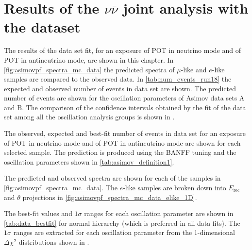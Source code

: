 \clearpage

\section {Results of the $\nu\bar{\nu}$ joint analysis with the \RunPeriod dataset}
\label{sec:results}

The results of the \RunPeriod data set fit, for an exposure of \TotalPotNuRunOneEight POT in neutrino mode and of \TotalPotNuBarRunOneEight POT in antineutrino mode, are shown in this chapter. In \cref{fig:asimovpf_spectra_mc_data} the predicted spectra of $\mu$-like and $e$-like samples are compared to the observed data. In \cref{tab:num_events_run18} the expected and observed number of events in \RunPeriod data set are shown. The predicted number of events are shown for the oscillation parameters of Asimov data sets A and B. The comparison of the confidence intervals obtained by the fit of the \RunPeriod data set among all the oscillation analysis groups is shown in \cite{MaCh3:2017}.

\begin{table}[htb]
\centering
\begin{adjustbox}{width=\textwidth, totalheight=\textheight, keepaspectratio}

\end{adjustbox}
\caption{
The observed, expected and best-fit number of events in \RunPeriod data set for an exposure of \TotalPotNuRunOneEight POT in neutrino mode and of \TotalPotNuBarRunOneEight POT in antineutrino mode are shown 
for each selected sample. The prediction is produced using the BANFF tuning and the oscillation parameters shown in \cref{tab:asimov_definition1}.
}
\label{tab:num_events_run18}
\end{table}

The predicted and observed spectra are shown for each of the samples in \cref{fig:asimovpf_spectra_mc_data}. The $e$-like samples are broken down into $E_\text{rec}$ and $\theta$ projections in \cref{fig:asimovpf_spectra_mc_data_elike_1D}.



The best-fit values and $1\sigma$ ranges for each oscillation parameter are shown in \cref{tab:data_bestfit} for normal hierarchy (which is preferred in all data fits). The $1\sigma$ ranges are extracted for each oscillation parameter from the 1-dimensional $\Delta \chi^2$ distributions shown in .


